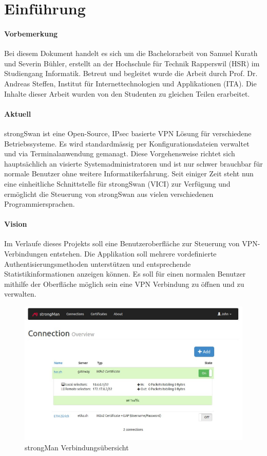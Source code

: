 \section{Einführung}
\label{subsec:vision}

\paragraph{Vorbemerkung}
Bei diesem Dokument handelt es sich um die Bachelorarbeit von Samuel Kurath und Severin Bühler, erstellt an der Hochschule für Technik Rapperswil (HSR) im Studiengang
Informatik. Betreut und begleitet wurde die Arbeit durch Prof. Dr. Andreas Steffen, Institut für Internettechnologien und Applikationen (ITA). Die Inhalte dieser Arbeit
wurden von den Studenten zu gleichen Teilen erarbeitet.

\paragraph{Aktuell}
strongSwan ist eine Open-Source, IPsec basierte VPN Lösung für verschiedene Betriebssysteme. Es wird standardmässig per Konfigurationsdateien verwaltet und via Terminalanwendung gemanagt. Diese Vorgehensweise richtet sich hauptsächlich an visierte Systemadministratoren und ist nur schwer brauchbar für normale Benutzer ohne weitere Informatikerfahrung. Seit einiger Zeit steht nun eine einheitliche Schnittstelle für strongSwan (VICI) zur Verfügung und ermöglicht die Steuerung von strongSwan aus vielen verschiedenen Programmiersprachen.

\paragraph{Vision} 
Im Verlaufe dieses Projekts soll eine Benutzeroberfläche zur Steuerung von VPN-Verbindungen entstehen. Die Applikation soll mehrere vordefinierte Authentisierungsmethoden  unterstützen und entsprechende Statistikinformationen anzeigen können. Es soll für einen normalen Benutzer mithilfe der Oberfläche möglich sein eine VPN Verbindung zu öffnen und zu verwalten.\\


\begin{figure}[H]
\centering
\includegraphics[width=440pt]{images/strongMan_einfuhrung.jpg}
\caption[strongMan Verbindungsübersicht]{strongMan Verbindungsübersicht}
\end{figure}